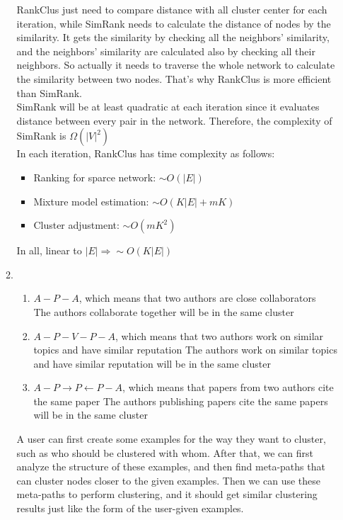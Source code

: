 \documentclass[10pt, a4paper]{article}
\begin{document}
\begin{enumerate}
\begin{enumerate}
        RankClus just need to compare distance with all cluster center for each iteration, while SimRank needs to calculate the distance of nodes by the similarity. It gets the similarity by checking all the neighbors' similarity, and the neighbors' similarity are calculated also by checking all their neighbors. So actually it needs to traverse the whole network to calculate the similarity between two nodes. That's why RankClus is more efficient than SimRank.\\
        SimRank will be at least quadratic at each iteration since it evaluates distance between every pair in the network. Therefore, the complexity of SimRank is $\Omega\left(|V|^2\right)$\\
        In each iteration, RankClus has time complexity as follows:
        \begin{itemize}
        \item Ranking for sparce network: $\sim O\left(|E|\right)$
        \item Mixture model estimation: $\sim O\left(K|E| + mK\right)$
        \item Cluster adjustment: $\sim O\left(mK^2\right)$
        \end{itemize}
        In all, linear to $|E| \Rightarrow \sim O\left(K|E|\right)$
    \item\mbox{}
        \begin{enumerate}
            \item $A - P - A$, which means that two authors are close collaborators\\
                The authors collaborate together will be in the same cluster
            \item $A - P - V - P - A$, which means that two authors work on similar topics and have similar reputation
                The authors work on similar topics and have similar reputation will be in the same cluster
            \item $A - P \rightarrow P \leftarrow P - A$, which means that papers from two authors cite the same paper
                The authors publishing papers cite the same papers will be in the same cluster
        \end{enumerate}
        A user can first create some examples for the way they want to cluster, such as who should be clustered with whom. After that, we can first analyze the structure of these examples, and then find meta-paths that can cluster nodes closer to the given examples. Then we can use these meta-paths to perform clustering, and it should get similar clustering results just like the form of the user-given examples.

\end{enumerate}
\end{enumerate}
\end{document}
